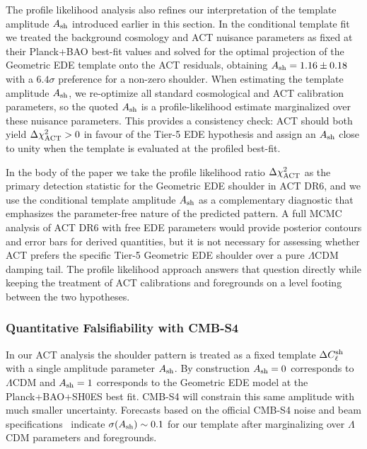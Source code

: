 \documentclass[a4paper,11pt]{article}
\begin{document}
The profile likelihood analysis also refines our interpretation of the template amplitude $A_{\rm sh}$ introduced earlier in this section. In the conditional template fit we treated the background cosmology and ACT nuisance parameters as fixed at their Planck+BAO best-fit values and solved for the optimal projection of the Geometric EDE template onto the ACT residuals, obtaining $A_{\rm sh}=1.16\pm0.18$ with a $6.4\sigma$ preference for a non-zero shoulder. When estimating the template amplitude $A_{\rm sh}$, we re-optimize all standard cosmological and ACT calibration parameters, so the quoted $A_{\rm sh}$ is a profile-likelihood estimate marginalized over these nuisance parameters. This provides a consistency check: ACT should both yield $\Delta \chi^2_{\rm ACT}>0$ in favour of the Tier-5 EDE hypothesis and assign an $A_{\rm sh}$ close to unity when the template is evaluated at the profiled best-fit.

In the body of the paper we take the profile likelihood ratio $\Delta \chi^2_{\rm ACT}$ as the primary detection statistic for the Geometric EDE shoulder in ACT DR6, and we use the conditional template amplitude $A_{\rm sh}$ as a complementary diagnostic that emphasizes the parameter-free nature of the predicted pattern. A full MCMC analysis of ACT DR6 with free EDE parameters would provide posterior contours and error bars for derived quantities, but it is not necessary for assessing whether ACT prefers the specific Tier-5 Geometric EDE shoulder over a pure $\Lambda$CDM damping tail. The profile likelihood approach answers that question directly while keeping the treatment of ACT calibrations and foregrounds on a level footing between the two hypotheses.

\subsubsection{Quantitative Falsifiability with CMB-S4}

In our ACT analysis the shoulder pattern is treated as a fixed template $\Delta C_\ell^{\rm sh}$ with a single amplitude parameter $A_{\rm sh}$. By construction $A_{\rm sh} = 0$ corresponds to $\Lambda$CDM and $A_{\rm sh} = 1$ corresponds to the Geometric EDE model at the Planck+BAO+SH0ES best fit. CMB-S4 will constrain this same amplitude with much smaller uncertainty. Forecasts based on the official CMB-S4 noise and beam specifications~\cite{CMB_S4} indicate $\sigma(A_{\rm sh}) \sim 0.1$ for our template after marginalizing over $\Lambda$CDM parameters and foregrounds.
\end{document}
